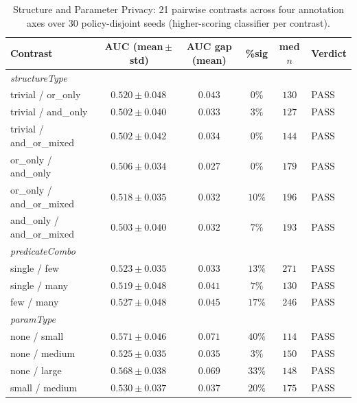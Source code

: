 \begin{table}[htbp]
  \caption{Structure and Parameter Privacy: 21 pairwise contrasts across four annotation
    axes over 30 policy-disjoint seeds (higher-scoring classifier per contrast).}
  \label{tab:spp-contrasts}
  \centering\footnotesize
  \begin{tabular}{lccccl}
    \toprule
    Contrast & AUC (mean\,$\pm$\,std) & AUC gap (mean) & \%sig & med $n$ & Verdict \\
    \midrule
    \multicolumn{6}{l}{\textit{structureType}} \\
    trivial / or\_only          & $0.520 \pm 0.048$ & $0.043$ & $0\%$  & $130$ & PASS \\
    trivial / and\_only         & $0.502 \pm 0.040$ & $0.033$ & $3\%$  & $127$ & PASS \\
    trivial / and\_or\_mixed    & $0.502 \pm 0.042$ & $0.034$ & $0\%$  & $144$ & PASS \\
    or\_only / and\_only        & $0.506 \pm 0.034$ & $0.027$ & $0\%$  & $179$ & PASS \\
    or\_only / and\_or\_mixed   & $0.518 \pm 0.035$ & $0.032$ & $10\%$ & $196$ & PASS \\
    and\_only / and\_or\_mixed  & $0.503 \pm 0.040$ & $0.032$ & $7\%$  & $193$ & PASS \\
    \midrule
    \multicolumn{6}{l}{\textit{predicateCombo}} \\
    single / few                & $0.523 \pm 0.035$ & $0.033$ & $13\%$ & $271$ & PASS \\
    single / many               & $0.519 \pm 0.048$ & $0.041$ & $7\%$  & $130$ & PASS \\
    few / many                  & $0.527 \pm 0.048$ & $0.045$ & $17\%$ & $246$ & PASS \\
    \midrule
    \multicolumn{6}{l}{\textit{paramType}} \\
    none / small                & $0.571 \pm 0.046$ & $0.071$ & $40\%$ & $114$ & PASS \\
    none / medium               & $0.525 \pm 0.035$ & $0.035$ & $3\%$  & $150$ & PASS \\
    none / large                & $0.568 \pm 0.038$ & $0.069$ & $33\%$ & $148$ & PASS \\
    small / medium              & $0.530 \pm 0.037$ & $0.037$ & $20\%$ & $175$ & PASS \\

\end{tabular}
\end{table}
